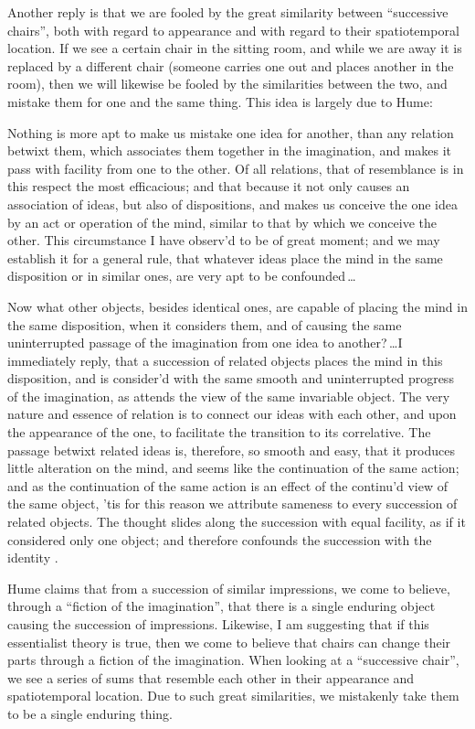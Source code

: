 \documentclass[11pt]{article}
\newenvironment{squote}{%
\begin{spacing}{1}
\begin{list}{}{%
\setlength{\labelwidth}{0pt}%
\rightmargin\leftmargin%
}
\item\relax
}{%
\end{list}%
\end{spacing}
}
\begin{document}
\begin{spacing}{1.5}
Another reply is that we are fooled by the great similarity between
``successive chairs'', both with regard to appearance and with regard
to their spatiotemporal location.  If we see a certain chair in the
sitting room, and while we are away it is replaced by a different
chair (someone carries one out and places another in the room), then
we will likewise be fooled by the similarities between the two, and
mistake them for one and the same thing.  This idea is largely due to
Hume:

\begin{squote}
Nothing is more apt to make us mistake one idea for another, than any
relation betwixt them, which associates them together in the
imagination, and makes it pass with facility from one to the other.
Of all relations, that of resemblance is in this respect the most
efficacious; and that because it not only causes an association of
ideas, but also of dispositions, and makes us conceive the one idea by
an act or operation of the mind, similar to that by which we conceive
the other.  This circumstance I have observ'd to be of great moment;
and we may establish it for a general rule, that whatever ideas place
the mind in the same disposition or in similar ones, are very apt to
be confounded\,\ldots

Now what other objects, besides identical ones, are capable of placing
the mind in the same disposition, when it considers them, and of
causing the same uninterrupted passage of the imagination from one
idea to another?\,\ldots I immediately reply, that a succession of
related objects places the mind in this disposition, and is consider'd
with the same smooth and uninterrupted progress of the imagination, as
attends the view of the same invariable object.  The very nature and
essence of relation is to connect our ideas with each other, and upon
the appearance of the one, to facilitate the transition to its
correlative.  The passage betwixt related ideas is, therefore, so
smooth and easy, that it produces little alteration on the mind, and
seems like the continuation of the same action; and as the
continuation of the same action is an effect of the continu'd view of
the same object, 'tis for this reason we attribute sameness to every
succession of related objects.  The thought slides along the
succession with equal facility, as if it considered only one object;
and therefore confounds the succession with the identity
\citep[135]{hume2000}.
\end{squote}

Hume claims that from a succession of similar impressions, we come to
believe, through a ``fiction of the imagination'', that there is a
single enduring object causing the succession of impressions.
Likewise, I am suggesting that if this essentialist theory is true,
then we come to believe that chairs can change their parts through a
fiction of the imagination.  When looking at a ``successive chair'',
we see a series of sums that resemble each other in their appearance
and spatiotemporal location.  Due to such great similarities, we
mistakenly take them to be a single enduring thing.


\end{spacing}
\end{document}

